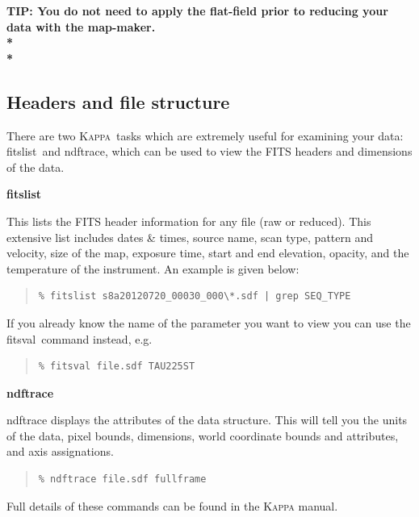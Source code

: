 \documentclass[twoside,11pt]{article}
\newcommand{\xref}[3]{#1}
\newcommand{\xlabel}[1]{}
\renewcommand{\_}{\texttt{\symbol{95}}}
\newenvironment{myquote}{
   \color{MidnightBlue}\begin{quote}\begin{small}}{
   \end{small}\end{quote}
}
\newcommand{\Kappa}{\xref{\textsc{Kappa}}{sun95}{}}
\newcommand{\task}[1]{\textsf{#1}}
\newcommand{\fitslist}{\xref{\task{fitslist}}{sun95}{FITSLIST}}
\newcommand{\fitsval}{\xref{\task{fitsval}}{sun95}{FITSVAL}}
\newcommand{\ndftrace}{\xref{\task{ndftrace}}{sun95}{NDFTRACE}}
\renewenvironment{myquote}{
      \begin{quote}\begin{small}}{
      \end{small}\end{quote}
   }
\begin{document}
\begin{htmlonly}
\textbf{TIP: You do not need to apply the flat-field
prior to reducing your data with the map-maker.\\*\\*}
\end{htmlonly}


\subsection{\xlabel{header}Headers and file structure}
\label{sec:fitsheader}

There are two \Kappa\ tasks which are extremely useful for examining
your data: \fitslist\ and \ndftrace, which can be used to view the
FITS headers and dimensions of the data.
\newline\newline
\begin{minipage}[t]{0.15\linewidth}
\textbf{fitslist}
\end{minipage}
\begin{minipage}[t]{0.85\linewidth}This lists the FITS header information
for any file (raw or reduced). This extensive list includes dates \& times,
source name, scan type, pattern and velocity, size of the map, exposure
time, start and end elevation, opacity, and the temperature of the
instrument. An example is given below:
\begin{myquote}
\begin{verbatim}
% fitslist s8a20120720_00030_000\*.sdf | grep SEQ_TYPE
\end{verbatim}
\end{myquote}
If you already know the name of the parameter you want to view you can
use the \fitsval\ command instead, e.g.\\
\begin{myquote}
\begin{verbatim}
% fitsval file.sdf TAU225ST
\end{verbatim}
\end{myquote}
\end{minipage}
\newline\newline
\begin{minipage}[t]{0.15\linewidth}
\textbf{ndftrace}
\end{minipage}
\begin{minipage}[t]{0.85\linewidth}
\task{ndftrace} displays the attributes of the data structure. This will tell
you the units of the data, pixel bounds, dimensions, world coordinate
bounds and attributes, and axis assignations.
\begin{myquote}
\begin{verbatim}
% ndftrace file.sdf fullframe
\end{verbatim}
\end{myquote}
\end{minipage}
\newline\newline
Full details of these commands can be found in the \xref{\textsc{Kappa} manual}{sun95}{}.
\end{document}
